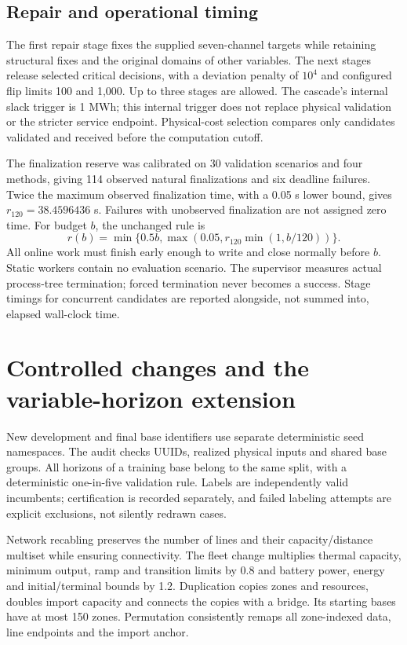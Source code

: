 \subsection{Repair and operational timing}
The first repair stage fixes the supplied seven-channel targets while
retaining structural fixes and the original domains of other variables.
The next stages release selected critical decisions, with a deviation penalty
of $10^4$ and configured flip limits 100 and 1,000. Up to three stages are
allowed. The cascade's internal slack trigger is 1 MWh; this internal trigger
does not replace physical validation or the stricter service endpoint.
Physical-cost selection compares only candidates validated and received
before the computation cutoff.

The finalization reserve was calibrated on 30 validation scenarios and four
methods, giving 114 observed natural finalizations and six deadline failures.
Twice the maximum observed finalization time, with a 0.05 s lower bound,
gives $r_{120}=38.4596436$ s. Failures with unobserved finalization are not
assigned zero time. For budget $b$, the unchanged rule is
\begin{equation}
 r(b)=\min\{0.5b,\max(0.05,r_{120}\min(1,b/120))\}.
\end{equation}
All online work must finish early enough to write and close normally before
$b$. Static workers contain no evaluation scenario. The supervisor measures
actual process-tree termination; forced termination never becomes a success.
Stage timings for concurrent candidates are reported alongside, not summed
into, elapsed wall-clock time.

\section{Controlled changes and the variable-horizon extension}
\label{app:extensions}
New development and final base identifiers use separate deterministic seed
namespaces. The audit checks UUIDs, realized physical inputs and shared base
groups. All horizons of a training base belong to the same split, with a
deterministic one-in-five validation rule. Labels are independently valid
incumbents; certification is recorded separately, and failed labeling attempts
are explicit exclusions, not silently redrawn cases.

Network recabling preserves the number of lines and their capacity/distance
multiset while ensuring connectivity. The fleet change multiplies thermal
capacity, minimum output, ramp and transition limits by 0.8 and battery power,
energy and initial/terminal bounds by 1.2. Duplication copies zones and
resources, doubles import capacity and connects the copies with a bridge.
Its starting bases have at most 150 zones. Permutation consistently remaps
all zone-indexed data, line endpoints and the import anchor.

